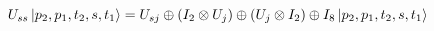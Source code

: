 \documentclass[preview, border={5pt,5pt,5pt,5pt}]{standalone}
\begin{document}
$
U_{ss}\ket{p_2,p_1,t_2,s,t_1} = U_{sj} \oplus (I_2\otimes U_{j}) \oplus (U_{j} \otimes I_2) \oplus I_8\ket{p_2,p_1,t_2,s,t_1}
$
\end{document}
